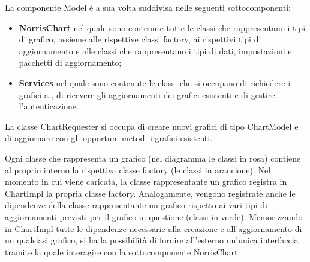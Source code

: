 La componente Model è a sua volta suddivisa nelle seguenti sottocomponenti:
\begin{itemize}
\item \textbf{NorrisChart} nel quale sono contenute tutte le classi che rappresentano i tipi di grafico, assieme alle rispettive classi factory, ai rispettivi tipi di aggiornamento e alle classi che rappresentano i tipi di dati, impostazioni e pacchetti di aggiornamento; 
\item \textbf{Services} nel quale sono contenute le classi che si occupano di richiedere i grafici a , di ricevere gli aggiornamenti dei grafici esistenti e di gestire l'autenticazione.
\end{itemize}

La classe ChartRequester si occupa di creare nuovi grafici di tipo ChartModel e di aggiornare con gli opportuni metodi i grafici esistenti.

Ogni classe che rappresenta un grafico (nel diagramma le classi in rosa) contiene al proprio interno la rispettiva classe factory (le classi in arancione). Nel momento in cui viene caricata, la classe rappresentante un grafico registra in ChartImpl la propria classe factory. Analogamente, vengono registrate anche le dipendenze della classe rappresentante un grafico rispetto ai vari tipi di aggiornamenti previsti per il grafico in questione (classi in verde). Memorizzando in ChartImpl tutte le dipendenze necessarie alla creazione e all'aggiornamento di un qualsiasi grafico, si ha la possibilità di fornire all'esterno un'unica interfaccia tramite la quale interagire con la sottocomponente NorrisChart.

